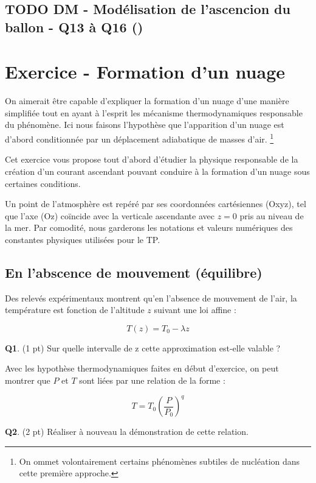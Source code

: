 \documentclass[letterpaper, 11pt]{article}
\begin{document}
\begin{itemize}
\begin{itemize}
\subsection{{\bfseries\sffamily TODO} DM - Modélisation de l'ascencion du ballon - Q13 à Q16 (\ddag{})}
\label{sec:orgadbaa23}


\section{Exercice - Formation d'un nuage}
\label{sec:org5c7c172}

On aimerait être capable d'expliquer la formation d'un nuage d'une manière simplifiée tout en ayant à l'esprit les mécanisme thermodynamiques responsable du phénomène. Ici nous faisons l'hypothèse que l'apparition d'un nuage est d'abord conditionnée par un déplacement adiabatique de masses d’air. \footnote{On ommet volontairement certains phénomènes subtiles de nucléation dans cette première approche.}

Cet exercice vous propose tout d'abord d'étudier la physique responsable de la création d’un courant ascendant pouvant conduire à la formation d'un nuage sous certaines conditions.

Un point de l'atmosphère est repéré par ses coordonnées cartésiennes (Oxyz), tel que l'axe (Oz) coïncide avec la verticale ascendante avec \(z=0\) pris au niveau de la mer. Par comodité, nous garderons les notations et valeurs numériques des constantes physiques utilisées pour le TP.

\subsection{En l'abscence de mouvement (équilibre)}
\label{sec:orgab17606}

Des relevés expérimentaux montrent qu'en l'absence de mouvement de l'air, la température est fonction de l'altitude \(z\) suivant une loi affine : 

$$ T(z) = T_{0} - \lambda z $$

\textbf{Q1}. (1 pt) Sur quelle intervalle de z cette approximation est-elle valable ?

Avec les hypothèse thermodynamiques faites en début d'exercice, on peut montrer que \(P\) et \(T\) sont liées par une relation de la forme : 

$$ T =T_0 \left( \frac{P}{P_0}  \right)^{q} $$

\textbf{Q2}. (2 pt) Réaliser à nouveau la démonstration de cette relation.


\end{itemize}
\end{itemize}
\end{document}
